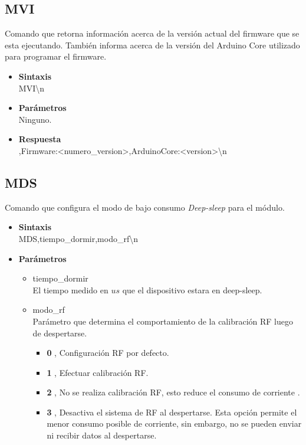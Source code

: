\documentclass[a4paper,spanish]{article}
\begin{document}
\subsection{MVI}
Comando que retorna información acerca de la versión actual del firmware que se esta ejecutando. También informa acerca de la versión del Arduino Core utilizado para programar el firmware.
\begin{itemize}
	\item \textbf{Sintaxis}\\
	{\ttfamily MVI\textbackslash n}
	\item \textbf{Parámetros}\\
	Ninguno.
	\item \textbf{Respuesta}\\
	{,Firmware:<numero\_version>,ArduinoCore:<version>\textbackslash n}
\end{itemize}

\subsection{MDS}
Comando que configura el modo de bajo consumo \textit{Deep-sleep} para el módulo.
\begin{itemize}
	\item \textbf{Sintaxis}\\
	{\ttfamily MDS,tiempo\_dormir,modo\_rf\textbackslash n}
	\item \textbf{Parámetros}
	\begin{itemize}
		\item{\ttfamily tiempo\_dormir}\\
		El tiempo medido en $us$ que el dispositivo estara en deep-sleep.
		\item{\ttfamily modo\_rf}\\
		Parámetro que determina el comportamiento de la calibración RF luego de despertarse.
		\begin{itemize}
			\item \textbf{0} , Configuración RF por defecto. 
			\item \textbf{1} , Efectuar calibración RF.
			\item \textbf{2} , No se realiza calibración RF, esto reduce el consumo de corriente .
			\item \textbf{3} , Desactiva el sistema de RF al despertarse. Esta opción permite el menor consumo posible de corriente, sin embargo, no se pueden enviar ni recibir datos al despertarse.
		\end{itemize}
	\end{itemize}
\end{itemize}
\end{document}
